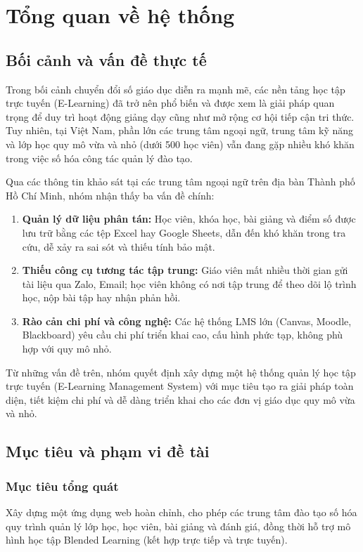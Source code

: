 \chapter{Tổng quan về hệ thống}

\section{Bối cảnh và vấn đề thực tế}

Trong bối cảnh chuyển đổi số giáo dục diễn ra mạnh mẽ, các nền tảng học tập trực tuyến (E-Learning) đã trở nên phổ biến và được xem là giải pháp quan trọng để duy trì hoạt động giảng dạy cũng như mở rộng cơ hội tiếp cận tri thức. Tuy nhiên, tại Việt Nam, phần lớn các trung tâm ngoại ngữ, trung tâm kỹ năng và lớp học quy mô vừa và nhỏ (dưới 500 học viên) vẫn đang gặp nhiều khó khăn trong việc số hóa công tác quản lý đào tạo.

Qua các thông tin khảo sát tại các trung tâm ngoại ngữ trên địa bàn Thành phố Hồ Chí Minh, nhóm nhận thấy ba vấn đề chính:

\begin{enumerate}
    \item \textbf{Quản lý dữ liệu phân tán:} Học viên, khóa học, bài giảng và điểm số được lưu trữ bằng các tệp Excel hay Google Sheets, dẫn đến khó khăn trong tra cứu, dễ xảy ra sai sót và thiếu tính bảo mật.
    \item \textbf{Thiếu công cụ tương tác tập trung:} Giáo viên mất nhiều thời gian gửi tài liệu qua Zalo, Email; học viên không có nơi tập trung để theo dõi lộ trình học, nộp bài tập hay nhận phản hồi.
    \item \textbf{Rào cản chi phí và công nghệ:} Các hệ thống LMS lớn (Canvas, Moodle, Blackboard) yêu cầu chi phí triển khai cao, cấu hình phức tạp, không phù hợp với quy mô nhỏ.
\end{enumerate}

Từ những vấn đề trên, nhóm quyết định xây dựng một hệ thống quản lý học tập trực tuyến (E-Learning Management System) với mục tiêu tạo ra giải pháp toàn diện, tiết kiệm chi phí và dễ dàng triển khai cho các đơn vị giáo dục quy mô vừa và nhỏ.

\section{Mục tiêu và phạm vi đề tài}

\subsection{Mục tiêu tổng quát}
Xây dựng một ứng dụng web hoàn chỉnh, cho phép các trung tâm đào tạo số hóa quy trình quản lý lớp học, học viên, bài giảng và đánh giá, đồng thời hỗ trợ mô hình học tập Blended Learning (kết hợp trực tiếp và trực tuyến).

